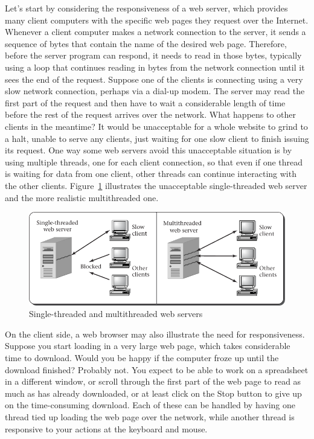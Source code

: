 Let's start by considering the responsiveness of a web server, which provides many client
computers with the specific web pages they request over the Internet.
Whenever a client computer makes a network connection to the server,
it sends a sequence of bytes that contain the name of the desired web
page.  Therefore, before the server program can respond, it needs to
read in those bytes, typically using a loop that continues reading in
bytes from the network connection until it sees the end of the
request.  Suppose one of the clients is connecting using a very slow
network connection, perhaps via a dial-up modem.  The server may read
the first part of the request and then have to wait a considerable
length of time before the rest of the request arrives over the network.  What
happens to other clients in the meantime?  It would be
unacceptable for a whole website to grind to a halt, unable to serve
any clients, just waiting for one slow client to finish issuing its
request.  One way some web servers avoid this unacceptable situation
is by using multiple threads, one for each client connection, so that
even if one thread is waiting for data from one client, other threads
can continue interacting with the other clients.
Figure~\ref{scan-2-3} illustrates the unacceptable single-threaded web
server and the more realistic multithreaded one.
\begin{figure}
\centerline{\includegraphics{hail_f0205}}
\caption{Single-threaded and multithreaded web servers}
\label{scan-2-3}
\end{figure}

On the client side, a web browser may also illustrate the need for
responsiveness.  Suppose you start loading in a very large web page,
which takes considerable time to download.  Would you be happy
if the computer froze up until the download finished?
Probably not.  You expect to be able to work on a spreadsheet in a
different window, or scroll through the first part of the web page to
read as much as has already downloaded, or at least click on the
Stop button to give up on the time-consuming download.  Each of
these can be handled by having one thread tied up loading the web page
over the network, while another thread is responsive to your actions
at the keyboard and mouse.

